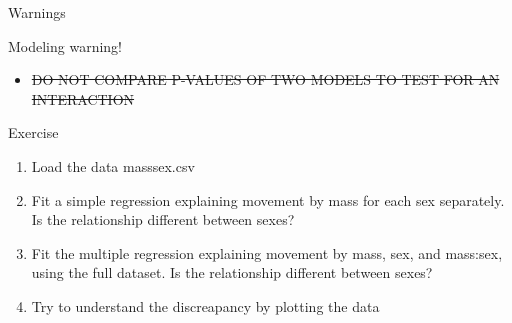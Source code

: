 \documentclass[10pt]{beamer}\usepackage[]{graphicx}\usepackage[]{color}
\begin{document}
\begin{frame}[fragile]{Warnings}
  \begin{alertblock}{Modeling warning!}
    \begin{itemize}
      \item \sout{DO NOT COMPARE P-VALUES OF TWO MODELS TO TEST FOR AN INTERACTION}
    \end{itemize}
  \end{alertblock}





  \begin{alertblock}{Exercise}
    \begin{enumerate}
      \item Load the data masssex.csv
      \item Fit a simple regression explaining movement by mass for each sex separately. Is the relationship different between sexes?
      \item Fit the multiple regression explaining movement by mass, sex, and mass:sex, using the full dataset. Is the relationship different between sexes?
      \item Try to understand the discreapancy by plotting the data
    \end{enumerate}
  \end{alertblock}

\end{frame}
\end{document}
